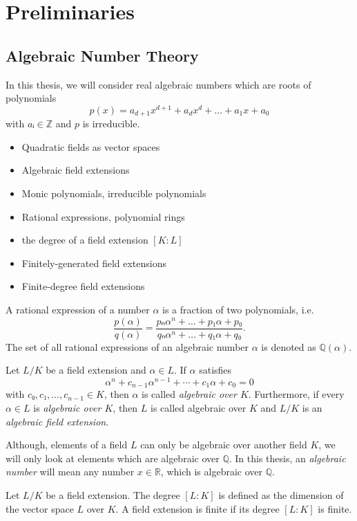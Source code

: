 \chapter{Preliminaries}
\label{ch:preliminaries}

\section{Algebraic Number Theory}

In this thesis, we will consider real algebraic numbers which are roots of polynomials
\[
  p(x) = a_{d+1} x^{d+1} + a_d x^d + \dots + a_1 x + a_0
\]
with $aᵢ ∈ ℤ$ and $p$ is irreducible.

\begin{itemize}
  \item Quadratic fields as vector spaces
  \item Algebraic field extensions
  \item Monic polynomials, irreducible polynomials
  \item Rational expressions, polynomial rings
  \item the degree of a field extension $[K : L]$
  \item Finitely-generated field extensions
  \item Finite-degree field extensions
\end{itemize}

A rational expression of a number $α$ is a fraction of two polynomials, i.e.
\[
  \frac{p(α)}{q(α)} = \frac{pₙ α^n + \dots + p₁ α + p₀}{qₙ α^n + \dots + q₁ α + q₀}.
\]
The set of all rational expressions of an algebraic number $α$ is denoted as $ℚ(α)$.

\begin{definition}
  Let $L/K$ be a field extension and $α ∈ L$.
  If $α$ satisfies
  \[
    α^n + c_{n-1} α^{n-1} + ⋯ + c_1 α + c_0 = 0
  \]
  with $c₀, c₁, …, c_{n-1} ∈ K$,
  then $α$ is called \emph{algebraic over $K$}.
  Furthermore, if every $α ∈ L$ is \emph{algebraic over $K$}, then $L$ is called
  algebraic over $K$ and $L/K$ is an \emph{algebraic field extension}.
\end{definition}

Although, elements of a field $L$ can only be algebraic over another field $K$,
we will only look at elements which are algebraic over $ℚ$.
In this thesis, an \emph{algebraic number} will mean any number $x ∈ ℝ$, which
is algebraic over $ℚ$.

\begin{definition}
  Let $L/K$ be a field extension.
  The degree $[L : K]$ is defined as the dimension of the vector space $L$ over $K$.
  A field extension is finite if its degree $[L : K]$ is finite.
\end{definition}

